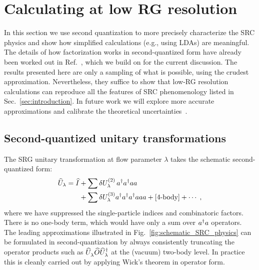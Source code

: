 \documentclass[10pt,aps,prc,floatfix,twocolumn,nofootinbib]{revtex4-1}
\begin{document}
\section{Calculating at low RG resolution} \label{sec:low_resolution}

In this section we use second quantization to more precisely characterize the SRC physics and show how simplified calculations (e.g., using LDAs) are meaningful.
The details of how factorization works in second-quantized form have already been worked out in Ref.~\cite{Bogner:2012zm}, which we build on for the current discussion.
The results presented here are only a sampling of what is possible, using the crudest approximation.
Nevertheless, they suffice to show that low-RG resolution calculations can reproduce all the features of SRC phenomenology listed in Sec.~\ref{sec:introduction}.
In future work we will explore more accurate approximations and calibrate the theoretical uncertainties~\cite{Tropiano:2021prep}.

\subsection{Second-quantized unitary transformations}
\label{subsec:second-quantization}


The SRG unitary transformation at flow parameter $\lambda$ takes the schematic second-quantized form:
%
\begin{align} 
    \Uhat_\lambda = \Ihat 
     &+ \sum  \delta U^{(2)}_\lambda \,
    \akdag\akdag aa
    \notag\\ 
    \null &+ \sum \delta U^{(3)}_\lambda\akdag\akdag\akdag aaa
     + [\mbox{4-body}] + \cdots
    \;,  \label{eq:Uschematic} 
\end{align}
%
where we have suppressed the single-particle indices and combinatoric factors.
There is no one-body term, which would have only a sum over $a^{\dagger} a$ operators.
The leading approximations illustrated in Fig.~\ref{fig:schematic_SRC_physics} can be formulated in second-quantization by always consistently truncating the operator products such as $\Uhatlam \widehat O \Uhatlamdag$ at the (vacuum) two-body level. 
In practice this is cleanly carried out by applying Wick's theorem in operator form.
\end{document}
